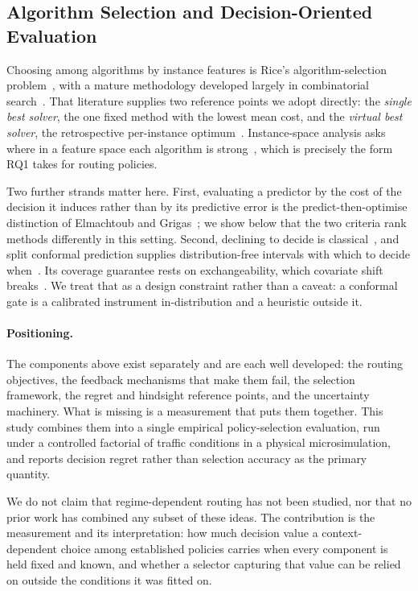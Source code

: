\documentclass[runningheads]{llncs}
\begin{document}
\subsection{Algorithm Selection and Decision-Oriented Evaluation}

Choosing among algorithms by instance features is Rice's algorithm-selection
problem~\cite{rice1976}, with a mature methodology developed largely in
combinatorial search~\cite{xu2008satzilla,smithmiles2009,kotthoff2014survey}.
That literature supplies two reference points we adopt directly: the
\emph{single best solver}, the one fixed method with the lowest mean cost, and
the \emph{virtual best solver}, the retrospective per-instance
optimum~\cite{bischl2016aslib}. Instance-space analysis asks where in a feature
space each algorithm is strong~\cite{smithmiles2014instance}, which is
precisely the form RQ1 takes for routing policies.

Two further strands matter here. First, evaluating a predictor by the cost of
the decision it induces rather than by its predictive error is the
predict-then-optimise distinction of Elmachtoub and
Grigas~\cite{elmachtoub2022spo}; we show below that the two criteria rank
methods differently in this setting. Second, declining to decide is
classical~\cite{chow1970reject}, and split conformal prediction supplies
distribution-free intervals with which to decide when~\cite{vovk2005alrw,%
lei2018conformal}. Its coverage guarantee rests on exchangeability, which
covariate shift breaks~\cite{shimodaira2000,tibshirani2019covshift}. We treat
that as a design constraint rather than a caveat: a conformal gate is a
calibrated instrument in-distribution and a heuristic outside it.

\paragraph{Positioning.}
The components above exist separately and are each well developed: the routing
objectives, the feedback mechanisms that make them fail, the selection
framework, the regret and hindsight reference points, and the uncertainty
machinery. What is missing is a measurement that puts them together. This study
combines them into a single empirical policy-selection evaluation, run under a
controlled factorial of traffic conditions in a physical microsimulation, and
reports decision regret rather than selection accuracy as the primary quantity.

We do not claim that regime-dependent routing has not been studied, nor that no
prior work has combined any subset of these ideas. The contribution is the
measurement and its interpretation: how much decision value a context-dependent
choice among established policies carries when every component is held fixed and
known, and whether a selector capturing that value can be relied on outside the
conditions it was fitted on.
\end{document}
